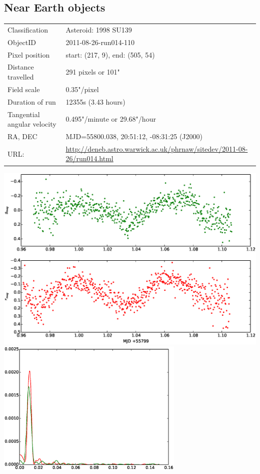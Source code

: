 \newpage
\subsection{Near Earth objects}

  \begin{tabular}{l l}
  Classification & Asteroid: 1998 SU139 \\
  ObjectID & 2011-08-26-run014-110 \\
  Pixel position & start: (217, 9), end: (505, 54) \\
  Distance travelled & 291 pixels or 101" \\
  Field scale & 0.35"/pixel \\
  Duration of run & 12355s (3.43 hours) \\
  Tangential angular velocity & 0.495"/minute or 29.68"/hour\\ 
  RA, DEC & MJD=55800.038, 20:51:12, -08:31:25 (J2000) \\
  URL: & \small \url{http://deneb.astro.warwick.ac.uk/phrnaw/sitedev/2011-08-26/run014.html} \\
  \end{tabular}
  \includegraphics[width=140mm]{images/2011-08-26-run014-110-lightcurve.eps} \\
  \includegraphics[width=90mm]{images/asteroid_pgram.eps} \\

